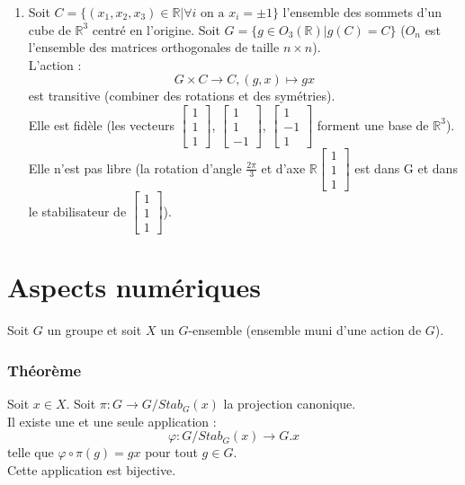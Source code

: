 \documentclass[a4paper, oneside]{report}
\theoremstyle{break}
\newcommand{\x}{\times}
\newcommand{\R}{\mathbb{R}}
\newcommand{\theo}{\subsubsection{Théorème}}
\begin{document}
\begin{enumerate}
\item Soit $C=\{(x_1,x_2,x_3) \in \R | \forall i\text{ on a } x_i= \pm 1 \}$ l'ensemble des sommets d'un cube de $\R^3$ centré en l'origine. Soit $G = \{g \in O_3(\R) | g(C)=C \}$ ($O_n$ est l'ensemble des matrices orthogonales de taille $n\x n$).\\
L'action :
$$G\x C \rightarrow C, (g,x)\mapsto gx$$
est transitive (combiner des rotations et des symétries).\\
Elle est fidèle (les vecteurs $\left[\begin{array}{l}
1\\
1\\
1
\end{array}\right]$, $\left[\begin{array}{l}
1\\
1\\
-1
\end{array}\right]$, $\left[\begin{array}{l}
1\\
-1\\
1
\end{array}\right]$ forment une base de $\R^3$).\\
Elle n'est pas libre (la rotation d'angle $\frac{2\pi}{3}$ et d'axe $\R \left[\begin{array}{l}
1\\
1\\
1
\end{array}\right]$ est dans G et dans le stabilisateur de $\left[\begin{array}{l}
1\\
1\\
1
\end{array}\right]$).
\end{enumerate}

\section{Aspects numériques}

Soit $G$ un groupe et soit $X$ un $G$-ensemble (ensemble muni d'une action de $G$).

\theo
Soit $x\in X$. Soit $\pi : G \rightarrow G/Stab_G(x)$ la projection canonique.\\
Il existe une et une seule application :
$$\varphi : G/Stab_G(x) \rightarrow G.x$$
telle que $\varphi \circ \pi(g)=gx$ pour tout $g\in G$.\\
Cette application est bijective.
\end{document}
